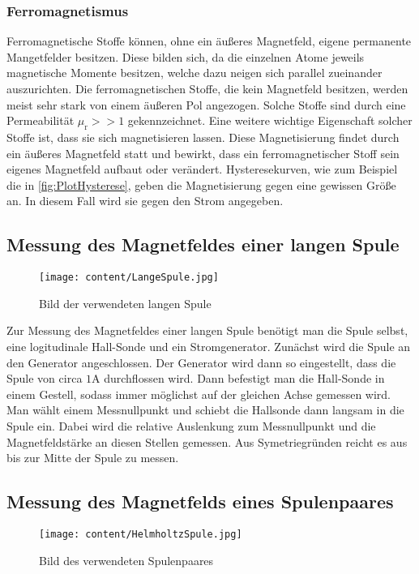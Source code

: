 \subsubsection{Ferromagnetismus}
\label{subsubsec:FERRO}
Ferromagnetische Stoffe können, ohne ein äußeres Magnetfeld, eigene permanente Mangetfelder besitzen. Diese bilden sich, da die einzelnen Atome jeweils magnetische Momente besitzen, welche 
dazu neigen sich parallel zueinander auszurichten. Die ferromagnetischen Stoffe, die kein Magnetfeld besitzen, werden meist sehr stark von einem äußeren Pol angezogen. Solche Stoffe 
sind durch eine Permeabilität $\mu_{\text{r}} >> 1$ gekennzeichnet. Eine weitere wichtige Eigenschaft solcher Stoffe ist, dass sie sich magnetisieren lassen. Diese Magnetisierung findet
durch ein äußeres Magnetfeld statt und bewirkt, dass ein ferromagnetischer Stoff sein eigenes Magnetfeld aufbaut oder verändert. Hysteresekurven, wie zum Beispiel die in \autoref{fig:PlotHysterese},
geben die Magnetisierung gegen eine gewissen Größe an. In diesem Fall wird sie gegen den Strom angegeben.
\subsection{Messung des Magnetfeldes einer langen Spule}
\label{subsec:D_Lange_Spule}
\begin{figure}
    \centering
    \caption{Bild der verwendeten langen Spule}
    \label{fig:Aufbau_lange_Spule}
    \texttt{[image: content/LangeSpule.jpg]}
\end{figure}
Zur Messung des Magnetfeldes einer langen Spule benötigt man die Spule selbst, eine logitudinale Hall-Sonde und ein Stromgenerator. Zunächst wird die Spule an den Generator angeschlossen.
Der Generator wird dann so eingestellt, dass die Spule von circa $1 \unit{\ampere}$ durchflossen wird. Dann befestigt man die Hall-Sonde in einem Gestell, sodass immer möglichst auf der
gleichen Achse gemessen wird. Man wählt einem Messnullpunkt und schiebt die Hallsonde dann langsam in die Spule ein. Dabei wird die relative Auslenkung zum Messnullpunkt und die Magnetfeldstärke 
an diesen Stellen gemessen. Aus Symetriegründen reicht es aus bis zur Mitte der Spule zu messen. 
\subsection{Messung des Magnetfelds eines Spulenpaares}
\label{D_Spulenpaar}
\begin{figure}
    \centering
    \caption{Bild des verwendeten Spulenpaares}
    \label{fig:Aufbau_Spulenpaar}
    \texttt{[image: content/HelmholtzSpule.jpg]}
\end{figure}
